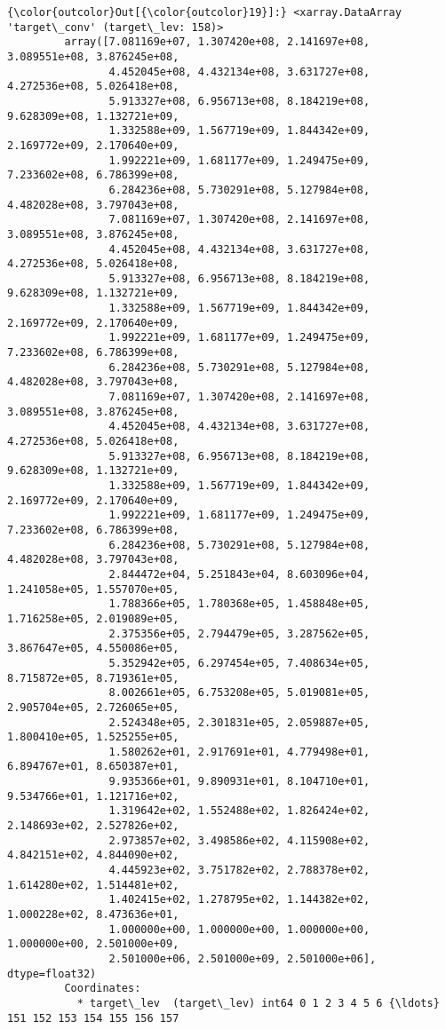 \documentclass[11pt]{article}
\begin{document}
\begin{Verbatim}[commandchars=\\\{\}]
{\color{outcolor}Out[{\color{outcolor}19}]:} <xarray.DataArray 'target\_conv' (target\_lev: 158)>
         array([7.081169e+07, 1.307420e+08, 2.141697e+08, 3.089551e+08, 3.876245e+08,
                4.452045e+08, 4.432134e+08, 3.631727e+08, 4.272536e+08, 5.026418e+08,
                5.913327e+08, 6.956713e+08, 8.184219e+08, 9.628309e+08, 1.132721e+09,
                1.332588e+09, 1.567719e+09, 1.844342e+09, 2.169772e+09, 2.170640e+09,
                1.992221e+09, 1.681177e+09, 1.249475e+09, 7.233602e+08, 6.786399e+08,
                6.284236e+08, 5.730291e+08, 5.127984e+08, 4.482028e+08, 3.797043e+08,
                7.081169e+07, 1.307420e+08, 2.141697e+08, 3.089551e+08, 3.876245e+08,
                4.452045e+08, 4.432134e+08, 3.631727e+08, 4.272536e+08, 5.026418e+08,
                5.913327e+08, 6.956713e+08, 8.184219e+08, 9.628309e+08, 1.132721e+09,
                1.332588e+09, 1.567719e+09, 1.844342e+09, 2.169772e+09, 2.170640e+09,
                1.992221e+09, 1.681177e+09, 1.249475e+09, 7.233602e+08, 6.786399e+08,
                6.284236e+08, 5.730291e+08, 5.127984e+08, 4.482028e+08, 3.797043e+08,
                7.081169e+07, 1.307420e+08, 2.141697e+08, 3.089551e+08, 3.876245e+08,
                4.452045e+08, 4.432134e+08, 3.631727e+08, 4.272536e+08, 5.026418e+08,
                5.913327e+08, 6.956713e+08, 8.184219e+08, 9.628309e+08, 1.132721e+09,
                1.332588e+09, 1.567719e+09, 1.844342e+09, 2.169772e+09, 2.170640e+09,
                1.992221e+09, 1.681177e+09, 1.249475e+09, 7.233602e+08, 6.786399e+08,
                6.284236e+08, 5.730291e+08, 5.127984e+08, 4.482028e+08, 3.797043e+08,
                2.844472e+04, 5.251843e+04, 8.603096e+04, 1.241058e+05, 1.557070e+05,
                1.788366e+05, 1.780368e+05, 1.458848e+05, 1.716258e+05, 2.019089e+05,
                2.375356e+05, 2.794479e+05, 3.287562e+05, 3.867647e+05, 4.550086e+05,
                5.352942e+05, 6.297454e+05, 7.408634e+05, 8.715872e+05, 8.719361e+05,
                8.002661e+05, 6.753208e+05, 5.019081e+05, 2.905704e+05, 2.726065e+05,
                2.524348e+05, 2.301831e+05, 2.059887e+05, 1.800410e+05, 1.525255e+05,
                1.580262e+01, 2.917691e+01, 4.779498e+01, 6.894767e+01, 8.650387e+01,
                9.935366e+01, 9.890931e+01, 8.104710e+01, 9.534766e+01, 1.121716e+02,
                1.319642e+02, 1.552488e+02, 1.826424e+02, 2.148693e+02, 2.527826e+02,
                2.973857e+02, 3.498586e+02, 4.115908e+02, 4.842151e+02, 4.844090e+02,
                4.445923e+02, 3.751782e+02, 2.788378e+02, 1.614280e+02, 1.514481e+02,
                1.402415e+02, 1.278795e+02, 1.144382e+02, 1.000228e+02, 8.473636e+01,
                1.000000e+00, 1.000000e+00, 1.000000e+00, 1.000000e+00, 2.501000e+09,
                2.501000e+06, 2.501000e+09, 2.501000e+06], dtype=float32)
         Coordinates:
           * target\_lev  (target\_lev) int64 0 1 2 3 4 5 6 {\ldots} 151 152 153 154 155 156 157
\end{Verbatim}
            
\end{document}
